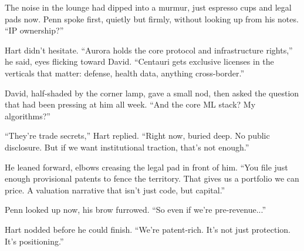 The noise in the lounge had dipped into a murmur, just espresso cups and legal pads now. Penn spoke first, quietly but 
firmly, without looking up from his notes. “IP ownership?”

Hart didn’t hesitate. ``Aurora holds the core protocol and infrastructure rights,” he said, eyes flicking toward David. 
“Centauri gets exclusive licenses in the verticals that matter: defense, health data, anything cross-border.''

David, half-shaded by the corner lamp, gave a small nod, then asked the question that had been pressing at him all week. 
``And the core ML stack? My algorithms?''

``They’re trade secrets,'' Hart replied. ``Right now, buried deep. No public disclosure. But if we want institutional traction, 
that’s not enough.''

He leaned forward, elbows creasing the legal pad in front of him. ``You file just enough provisional patents to fence the 
territory. That gives us a portfolio we can price. A valuation narrative that isn’t just code, but capital.''

Penn looked up now, his brow furrowed. ``So even if we’re pre-revenue...''

Hart nodded before he could finish. ``We’re patent-rich. It’s not just protection. It’s positioning.''

\medskip

